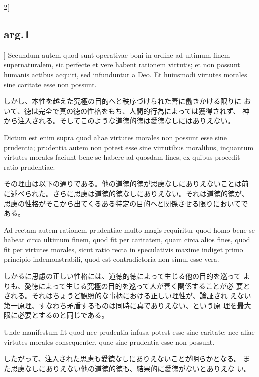 \documentclass[paper=a4paper,fontsize=10pt,jafontsize=9pt,titlepage]{jlreq}
\begin{document}
\begin{paracol}{2}[\subsection{arg.1}]
Secundum autem quod sunt operativae boni in ordine ad ultimum finem
 supernaturalem, sic perfecte et vere habent rationem virtutis; et non
 possunt humanis actibus acquiri, sed infunduntur a Deo. Et huiusmodi
 virtutes morales sine caritate esse non possunt.

\switchcolumn

しかし、本性を越えた究極の目的へと秩序づけられた善に働きかける限りに
 おいて、徳は完全で真の徳の性格をもち、人間的行為によっては獲得されず、
 神から注入される。そしてこのような道徳的徳は愛徳なしにはありえない。

\switchcolumn*

Dictum est enim supra quod aliae virtutes morales non
 possunt esse sine prudentia; prudentia autem non potest esse sine
 virtutibus moralibus, inquantum virtutes morales faciunt bene se
 habere ad quosdam fines, ex quibus procedit ratio prudentiae.

\switchcolumn

その理由は以下の通りである。他の道徳的徳が思慮なしにありえないことは前
に述べられた。さらに思慮は道徳的徳なしにありえない。それは道徳的徳が、
思慮の性格がそこから出てくるある特定の目的へと関係させる限りにおいてで
ある。

\switchcolumn*

Ad rectam autem rationem prudentiae multo magis requiritur quod homo
 bene se habeat circa ultimum finem, quod fit per caritatem, quam
 circa alios fines, quod fit per virtutes morales, sicut ratio recta
 in speculativis maxime indiget primo principio indemonstrabili, quod
 est contradictoria non simul esse vera.

\switchcolumn

しかるに思慮の正しい性格には、道徳的徳によって生じる他の目的を巡って
 よりも、愛徳によって生じる究極の目的を巡って人が善く関係することが必
 要とされる。それはちょうど観照的な事柄における正しい理性が、論証され
 えない第一原理、すなわち矛盾するものは同時に真でありえない、という原
 理を最大限に必要とするのと同じである。

\switchcolumn*

Unde manifestum fit quod nec
 prudentia infusa potest esse sine caritate; nec aliae virtutes
 morales consequenter, quae sine prudentia esse non possunt.

\switchcolumn

したがって、注入された思慮も愛徳なしにありえないことが明らかとなる。
 また思慮なしにありえない他の道徳的徳も、結果的に愛徳がないとありえな
 い。

\switchcolumn*


\end{paracol}
\end{document}
